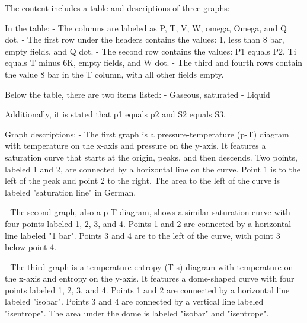 The content includes a table and descriptions of three graphs:

In the table:
- The columns are labeled as P, T, V, W, omega, Omega, and Q dot.
- The first row under the headers contains the values: 1, less than 8 bar, empty fields, and Q dot.
- The second row contains the values: P1 equals P2, Ti equals T minus 6K, empty fields, and W dot.
- The third and fourth rows contain the value 8 bar in the T column, with all other fields empty.

Below the table, there are two items listed:
- Gaseous, saturated
- Liquid

Additionally, it is stated that p1 equals p2 and S2 equals S3.

Graph descriptions:
- The first graph is a pressure-temperature (p-T) diagram with temperature on the x-axis and pressure on the y-axis. It features a saturation curve that starts at the origin, peaks, and then descends. Two points, labeled 1 and 2, are connected by a horizontal line on the curve. Point 1 is to the left of the peak and point 2 to the right. The area to the left of the curve is labeled "saturation line" in German.
  
- The second graph, also a p-T diagram, shows a similar saturation curve with four points labeled 1, 2, 3, and 4. Points 1 and 2 are connected by a horizontal line labeled "1 bar". Points 3 and 4 are to the left of the curve, with point 3 below point 4.

- The third graph is a temperature-entropy (T-s) diagram with temperature on the x-axis and entropy on the y-axis. It features a dome-shaped curve with four points labeled 1, 2, 3, and 4. Points 1 and 2 are connected by a horizontal line labeled "isobar". Points 3 and 4 are connected by a vertical line labeled "isentrope". The area under the dome is labeled "isobar" and "isentrope".